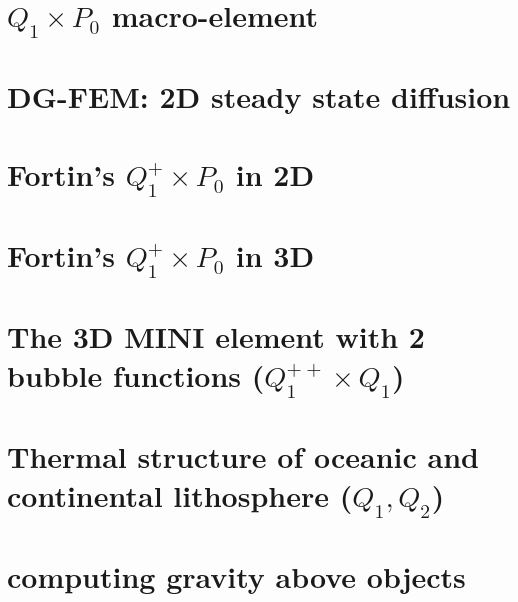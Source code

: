 \documentclass[a4paper,11pt]{report}
\begin{document}
\chapter{$Q_1\times P_0$ macro-element \label{f78}} %

\chapter{DG-FEM: 2D steady state diffusion \label{f79}} %

\chapter{Fortin's $Q_1^+\times P_0$ in 2D \label{f80}} %

\chapter{Fortin's $Q_1^+\times P_0$ in 3D \label{f81}} %

\chapter{The 3D MINI element with 2 bubble functions ($Q_1^{++}\times Q_1$) \label{f82}} %

\chapter{Thermal structure of oceanic and continental lithosphere ($Q_1,Q_2$)\label{f83}} %

\chapter{computing gravity above objects \label{f84}} %
\end{document}
